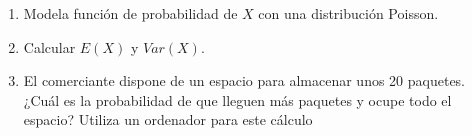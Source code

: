 \documentclass[
]{article}
\providecommand{\tightlist}{%
  \setlength{\itemsep}{0pt}\setlength{\parskip}{0pt}}
\begin{document}
\begin{enumerate}
  \begin{enumerate}
  \def\labelenumii{\alph{enumii}.}
  \tightlist
  \item
    Modela función de probabilidad de \(X\) con una distribución
    Poisson.
  \item
    Calcular \(E(X)\) y \(Var(X)\).
  \item
    El comerciante dispone de un espacio para almacenar unos 20
    paquetes. ¿Cuál es la probabilidad de que lleguen más paquetes y
    ocupe todo el espacio? Utiliza un ordenador para este cálculo
  \end{enumerate}
\end{enumerate}
\end{document}

